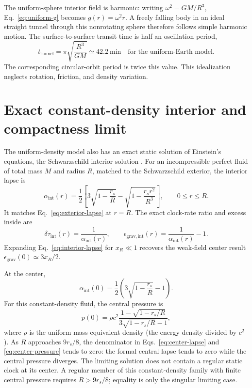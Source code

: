 \documentclass[12pt]{article}
\begin{document}
The uniform-sphere interior field is harmonic: writing $\omega^2=GM/R^3$, Eq.~\eqref{eq:uniform-g} becomes $g(r)=\omega^2r$. A freely falling body in an ideal straight tunnel through this nonrotating sphere therefore follows simple harmonic motion. The surface-to-surface transit time is half an oscillation period,
\begin{equation}
  t_{\mathrm{tunnel}}
  =\pi\sqrt{\frac{R^3}{GM}}
  \simeq42.2\ \mathrm{min}
  \quad\text{for the uniform-Earth model}.
  \label{eq:uniform-tunnel}
\end{equation}
The corresponding circular-orbit period is twice this value. This idealization neglects rotation, friction, and density variation.

\section{Exact constant-density interior and compactness limit}

The uniform-density model also has an exact static solution of Einstein's equations, the Schwarzschild interior solution \cite{SchwarzschildInterior}. For an incompressible perfect fluid of total mass $M$ and radius $R$, matched to the Schwarzschild exterior, the interior lapse is
\begin{equation}
  \alpha_{\mathrm{int}}(r)
  =\frac{1}{2}\left[
    3\sqrt{1-\frac{r_s}{R}}
    -\sqrt{1-\frac{r_s r^2}{R^3}}
  \right],
  \qquad 0\leq r\leq R.
  \label{eq:interior-lapse}
\end{equation}
It matches Eq.~\eqref{eq:exterior-lapse} at $r=R$. The exact clock-rate ratio and excess inside are
\begin{equation}
  \delta\tau_{\mathrm{int}}(r)=\frac{1}{\alpha_{\mathrm{int}}(r)},
  \qquad
  \epsilon_{\mathrm{grav,int}}(r)
  =\frac{1}{\alpha_{\mathrm{int}}(r)}-1.
  \label{eq:interior-inverse-rate}
\end{equation}
Expanding Eq.~\eqref{eq:interior-lapse} for $x_R\ll1$ recovers the weak-field center result $\epsilon_{\mathrm{grav}}(0)\simeq3x_R/2$.

At the center,
\begin{equation}
  \alpha_{\mathrm{int}}(0)
  =\frac{1}{2}\left(3\sqrt{1-\frac{r_s}{R}}-1\right).
  \label{eq:center-lapse}
\end{equation}
For this constant-density fluid, the central pressure is
\begin{equation}
  p(0)=\rho c^2
  \frac{1-\sqrt{1-r_s/R}}
       {3\sqrt{1-r_s/R}-1},
  \label{eq:center-pressure}
\end{equation}
where $\rho$ is the uniform mass-equivalent density (the energy density divided by $c^2$). As $R$ approaches $9r_s/8$, the denominator in Eqs.~\eqref{eq:center-lapse} and \eqref{eq:center-pressure} tends to zero: the formal central lapse tends to zero while the central pressure diverges. The limiting solution does not contain a regular static clock at its center. A regular member of this constant-density family with finite central pressure requires $R>9r_s/8$; equality is only the singular limiting case.
\end{document}
